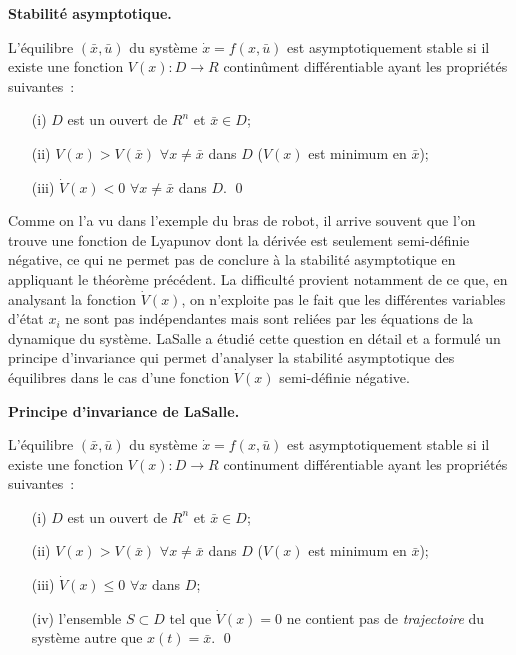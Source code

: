 \begin{theoreme}\label{stabasymp}{\bf Stabilité asymptotique.}

L'équilibre $(\bar x, \bar u)$ du système $\dot x = f(x,\bar u)$ est asymptotiquement stable si il existe une fonction $V(x): D \rightarrow R$ contin\^ument différentiable ayant les propriétés suivantes~:\\
\begin{itemize}
\item[(i)] $D$ est un ouvert de $R^n$ et $\bar x \in D$;\\
\item[(ii)] $V(x) > V(\bar x)$ $\forall x \neq \bar x$ dans $D$ ($V(x)$ est minimum en $\bar x$);\\
\item[(iii)] $\dot V(x) < 0$ $\forall x \neq \bar x$ dans $D$. \qed
\end{itemize}
\end{theoreme}

Comme on l'a vu dans l'exemple du bras de robot, il arrive souvent que l'on trouve une fonction de Lyapunov dont la dérivée est seulement semi-définie négative, ce qui ne permet pas de conclure à la stabilité asymptotique en appliquant le théorème précédent. La difficulté provient notamment de ce que, en analysant la fonction $\dot V(x)$, on n'exploite pas le fait que les différentes variables d'état $x_i$ ne sont pas indépendantes mais sont reliées par les équations de la dynamique du système. LaSalle a étudié cette question en détail et a formulé un principe d'invariance qui permet d'analyser la stabilité asymptotique des équilibres dans le cas d'une fonction $\dot V(x)$ semi-définie négative.
\newpage
\begin{theoreme}\label{lasalle}{\bf Principe d'invariance de LaSalle.}

L'équilibre $(\bar x, \bar u)$ du système $\dot x = f(x,\bar u)$ est asymptotiquement stable si il existe une fonction $V(x): D \rightarrow R$ continument différentiable ayant les propriétés suivantes~:\\
\begin{itemize}
\item[(i)] $D$ est un ouvert de $R^n$ et $\bar x \in D$;\\
\item[(ii)] $V(x) > V(\bar x)$ $\forall x \neq \bar x$ dans $D$ ($V(x)$ est minimum en $\bar x$);\\
\item[(iii)] $\dot V(x) \leq 0$ $\forall x$ dans  $D$;\\
\item[(iv)] l'ensemble $S \subset D$ tel que $\dot V(x) = 0$ ne contient pas de {\em trajectoire} du système autre que $x(t) = \bar x$. \qed
\end{itemize}
\end{theoreme}

